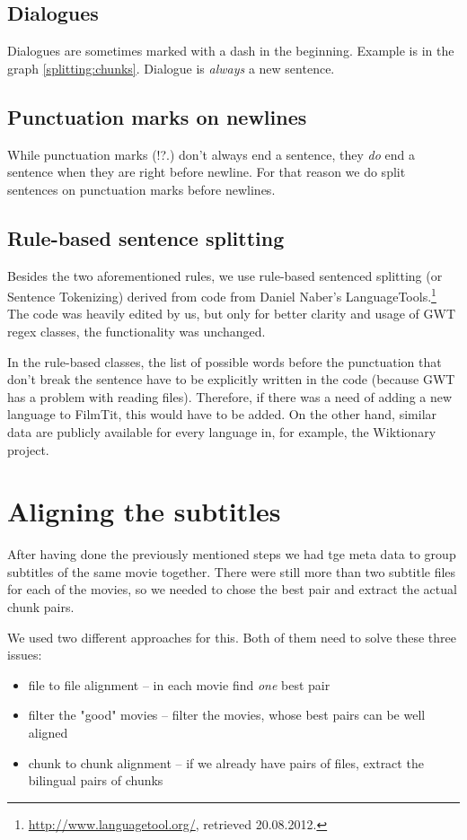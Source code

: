\subsection*{Dialogues}
Dialogues are sometimes marked with a dash in the beginning. Example is in the graph \ref{splitting:chunks}. Dialogue is \emph{always} a new sentence.

\subsection*{Punctuation marks on newlines}
While punctuation marks (!?.) don't always end a sentence, they \emph{do} end a sentence when they are right before newline. For that reason we do split sentences on punctuation marks before newlines.

\subsection*{Rule-based sentence splitting}
Besides the two aforementioned rules, we use rule-based sentenced splitting (or Sentence Tokenizing) derived from code from Daniel Naber's LanguageTools.\footnote{\url{http://www.languagetool.org/}, retrieved 20.08.2012.} The code was heavily edited by us, but only for better clarity and usage of GWT regex classes, the functionality was unchanged.

In the rule-based classes, the list of possible words before the punctuation that don't break the sentence have to be explicitly written in the code (because GWT has a problem with reading files). Therefore, if there was a need of adding a new language to FilmTit, this would have to be added. On the other hand, similar data are publicly available for every language in, for example, the Wiktionary project.

\section{Aligning the subtitles}
\label{sec:aligning_subtitles}

After having done the previously mentioned steps we had tge meta data to group subtitles of the same movie together. There were still more than two subtitle files for each of the movies, so we needed to chose the best pair and extract the actual chunk pairs.

We used two different approaches for this. Both of them need to solve these three issues:
\begin{itemize}
    \item file to file alignment -- in each movie find \emph{one} best pair
    \item filter the "good" movies -- filter the movies, whose best pairs can be well aligned
    \item chunk to chunk alignment -- if we already have pairs of files, extract the bilingual pairs of chunks 
\end{itemize}

